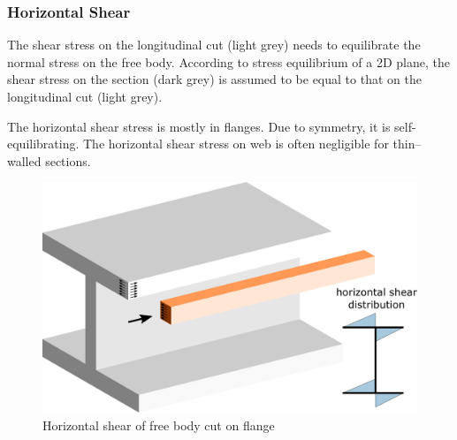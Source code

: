\subsubsection{Horizontal Shear}
The shear stress on the longitudinal cut (light grey) needs to equilibrate the normal stress on the free body. According to stress equilibrium of a 2D plane, the shear stress on the section (dark grey) is assumed to be equal to that on the longitudinal cut (light grey).

The horizontal shear stress is mostly in flanges. Due to symmetry, it is self-equilibrating. The horizontal shear stress on web is often negligible for thin--walled sections.
\begin{figure}[H]
\centering
\includegraphics[width=.8\textwidth]{PIC/CH05/SFB}
\caption{Horizontal shear of free body cut on flange}
\end{figure}
